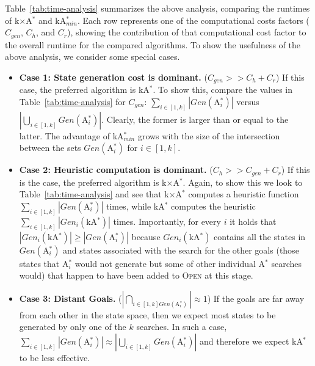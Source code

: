 \documentclass{aicom2e}
\newcommand{\astar}{A$^*$}
\newcommand{\kastar}{kA$^*$}
\newcommand{\kastarmin}{kA$^*_{min}$}
\newcommand{\kxastar}{k$\times$A$^*$}
\newcommand{\astari}[1]{A$^*_#1$}
\newcommand{\open}{\textsc{Open}}
\begin{document}
Table~\ref{tab:time-analysis} summarizes the above analysis, comparing the
runtimes of \kxastar{} and \kastarmin{}. Each row represents one of the
computational costs factors ($C_{gen}$, $C_{h}$, and $C_{r}$),
showing the contribution of that computational cost factor to the overall
runtime for the compared algorithms. To show the usefulness of the above
analysis, we consider some special cases.
\begin{itemize}
    \item {\bf Case 1: State generation cost is dominant.} ($C_{gen}>>C_{h}+C_r$)
    If this case, the preferred algorithm is \kastar{}. To show this,
    compare the values in Table~\ref{tab:time-analysis} for $C_{gen}$: $\sum_{i\in[1,k]} |Gen(\text{\astari{i}})|$
    versus $|\bigcup_{i\in[1,k]} Gen(\text{\astari{i}})|$. Clearly, the former is larger than or equal to the latter.
    The advantage of \kastarmin{} grows with the size of the intersection between the sets $Gen(\text{\astari{i}})$ for $i\in[1,k]$.

    \item {\bf Case 2: Heuristic computation is dominant.} ($C_{h}>>C_{gen}+C_r$)
    If this is the case, the preferred algorithm is \kxastar{}. Again, to show this we look to Table~\ref{tab:time-analysis} and see that \kxastar{} computes a heuristic function
    $\sum_{i\in[1,k]} |Gen(\text{\astari{i}})|$ times, while
    \kastar{} computes the heuristic $\sum_{i\in[1,k]} |Gen_i(\text{\kastar})|$ times.
    Importantly, for every $i$ it holds that $|Gen_i(\text{\kastar})|\geq |Gen(\text{\astari{i}})|$
    because $Gen_i(\text{\kastar})$ contains all the states in $Gen(\text{\astari{i}})$
    and states associated with the search for the other goals
    (those states that \astari{i} would not generate but some of other individual \astar{} searches would) that happen to have been added to \open{} at this stage.
    
   \item {\bf Case 3: Distant Goals.} ($|\bigcap_{i\in[1,k] Gen(\text{\astari{i}})}|\approx 1$) 
   If the goals are far away from each other in the state space, 
   then we expect most states to be generated by only one of the $k$ searches. 
   In such a case, $\sum_{i\in[1,k]}|Gen(\text{\astari{i}})|\approx |\bigcup\limits_{i\in[1,k]} Gen(\text{\astari{i}})|$
   and therefore we expect \kastar{} to be less effective. 
\end{itemize}
\end{document}
